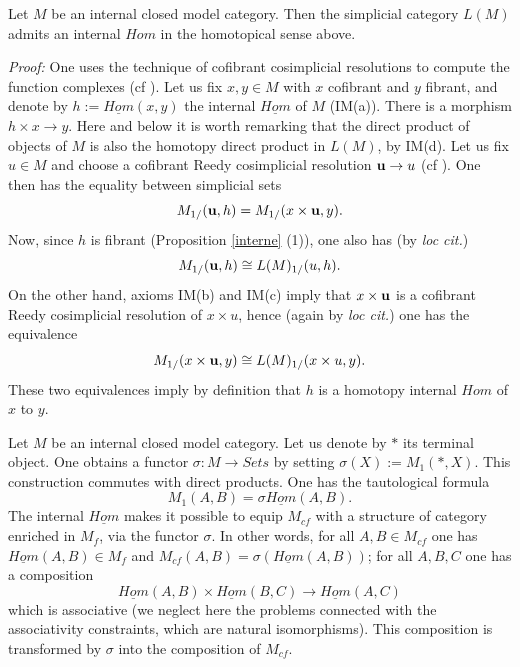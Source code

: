 \begin{proposition}
\label{hominterne}
Let $M$ be an internal closed model category. Then the simplicial category
$L(M)$ admits an internal $Hom$ in the homotopical sense above.
\end{proposition}
{\em Proof:}
One uses the technique of cofibrant cosimplicial resolutions to compute the
function complexes
(cf \cite{Hirschhorn} \cite{DHK} \cite{DwyerKan3}
\cite{JardineGoerssBook} \cite{Reedy}).
Let us fix $x,y\in M$ with $x$ cofibrant and $y$ fibrant, and denote by
$h:=\underline{Hom}(x,y)$ the internal $\underline{Hom}$ of $M$ (IM(a)). There
is a morphism $h\times x\rightarrow y$. Here and below it is worth remarking
that the direct product of objects of $M$ is also the homotopy direct product
in $L(M)$, by IM(d). Let us fix $u\in M$ and choose a cofibrant Reedy
cosimplicial resolution ${\bf u}\rightarrow u$
(cf \cite{Hirschhorn} \cite{DHK} \cite{DwyerKan3} \cite{JardineGoerssBook}
\cite{Reedy}). One then has the equality between simplicial sets
$$
M_{1/} ({\bf u}, h)= M_{1/}(x\times {\bf u}, y).
$$
Now, since $h$ is fibrant (Proposition \ref{interne} (1)), one also has
(by {\em loc cit.})
$$
M_{1/} ({\bf u}, h)\cong L(M)_{1/}(u,h).
$$
On the other hand, axioms IM(b) and IM(c) imply that $x\times {\bf u}$ is a
cofibrant Reedy cosimplicial resolution of $x\times u$, hence (again by
{\em loc cit.}) one has the equivalence
$$
M_{1/} (x\times {\bf u}, y)\cong L(M)_{1/}(x\times u, y).
$$
These two equivalences imply by definition that $h$ is a homotopy internal
$Hom$ of $x$ to $y$.
\eop


Let $M$ be an internal closed model category. Let us denote by $\ast$ its
terminal object. One obtains a functor $\sigma : M\rightarrow Sets$ by setting
$\sigma (X):= M_1(\ast , X)$. This construction commutes with direct products.
One has the tautological formula
$$
M_1(A,B) = \sigma \underline{Hom} (A,B).
$$
The internal $\underline{Hom}$ makes it possible to equip $M_{cf}$ with a
structure of category enriched in $M_f$, via the functor $\sigma$. In other
words, for all $A,B\in M_{cf}$ one has $\underline{Hom} (A,B)\in M_f$ and
$M_{cf}(A,B)=\sigma (\underline{Hom} (A,B))$;
for all $A,B,C$ one has a composition
$$
\underline{Hom} (A,B)\times \underline{Hom} (B,C)\rightarrow
\underline{Hom}(A,C)
$$
which is associative (we neglect here the problems connected with the
associativity constraints, which are natural isomorphisms). This composition
is transformed by $\sigma$ into the composition of $M_{cf}$.

